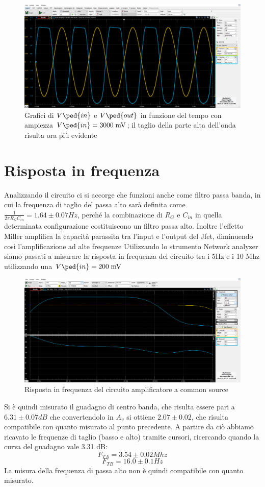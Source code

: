 \documentclass[10pt, a4paper, italian]{article}
\begin{document}
\begin{figure}[htbp]
    \centering
	\includegraphics[scale=0.4]{amp.3000}
    \caption{Grafici di $V\ped{in}$ e $V\ped{out}$ in funzione del tempo con ampiezza $V\ped{in}=3000 \; \si{m\V}$; il taglio della parte alta dell'onda risulta ora più evidente}
\end{figure}

\section{Risposta in frequenza}
Analizzando il circuito ci si accorge che funzioni anche come filtro passa banda, in cui la frequenza di taglio del passa alto sarà definita come $\frac{1}{2 \pi R_G C_{in}} = 1.64 \pm 0.07 Hz$, perché la combinazione di $R_G$ e $C_{in}$ in quella determinata configurazione costituiscono un filtro passa alto. Inoltre  l'effetto Miller amplifica la capacità parassita tra l'input e l'output del Jfet, diminuendo così l'amplificazione ad alte frequenze
Utilizzando lo strumento Network analyzer siamo passati a misurare la risposta in frequenza del circuito tra i 5Hz e i 10 Mhz utilizzando una $V\ped{in}=200 \; \si{m\V}$\\
\begin{figure}[htbp]
    \centering
	\includegraphics[scale=0.4]{net}
    \caption{Risposta in frequenza del circuito amplificatore a common source}
\end{figure}
Si è quindi misurato il guadagno di centro banda, che risulta essere pari a $6.31 \pm 0.07 dB$ che convertendolo in $A_v$ si ottiene $2.07 \pm 0.02$, che risulta compatibile con quanto misurato al punto precedente.
A partire da ciò abbiamo ricavato le frequenze di taglio (basso e alto) tramite cursori, ricercando quando la curva del guadagno vale 3.31 dB:
\[
F_{TA}=3.54 \pm 0.02Mhz
\]
\[
F_{TB}= 16.0 \pm 0.1Hz
\]
La misura della frequenza di passa alto non è quindi compatibile con quanto misurato.
\end{document}
